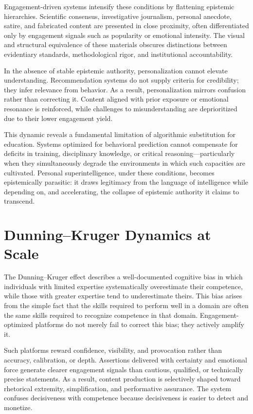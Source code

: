 \documentclass[12pt]{article}
\begin{document}
Engagement-driven systems intensify these conditions by flattening epistemic hierarchies. Scientific consensus, investigative journalism, personal anecdote, satire, and fabricated content are presented in close proximity, often differentiated only by engagement signals such as popularity or emotional intensity. The visual and structural equivalence of these materials obscures distinctions between evidentiary standards, methodological rigor, and institutional accountability.

In the absence of stable epistemic authority, personalization cannot elevate understanding. Recommendation systems do not supply criteria for credibility; they infer relevance from behavior. As a result, personalization mirrors confusion rather than correcting it. Content aligned with prior exposure or emotional resonance is reinforced, while challenges to misunderstanding are deprioritized due to their lower engagement yield.

This dynamic reveals a fundamental limitation of algorithmic substitution for education. Systems optimized for behavioral prediction cannot compensate for deficits in training, disciplinary knowledge, or critical reasoning—particularly when they simultaneously degrade the environments in which such capacities are cultivated. Personal superintelligence, under these conditions, becomes epistemically parasitic: it draws legitimacy from the language of intelligence while depending on, and accelerating, the collapse of epistemic authority it claims to transcend.

\section{Dunning--Kruger Dynamics at Scale}

The Dunning--Kruger effect describes a well-documented cognitive bias in which individuals with limited expertise systematically overestimate their competence, while those with greater expertise tend to underestimate theirs. This bias arises from the simple fact that the skills required to perform well in a domain are often the same skills required to recognize competence in that domain. Engagement-optimized platforms do not merely fail to correct this bias; they actively amplify it.

Such platforms reward confidence, visibility, and provocation rather than accuracy, calibration, or depth. Assertions delivered with certainty and emotional force generate clearer engagement signals than cautious, qualified, or technically precise statements. As a result, content production is selectively shaped toward rhetorical extremity, simplification, and performative assurance. The system confuses decisiveness with competence because decisiveness is easier to detect and monetize.
\end{document}
